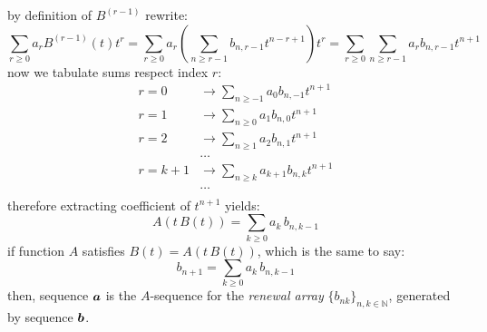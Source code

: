 by definition of $B^{(r-1)}$ rewrite:
\begin{displaymath}
    \sum_{r\geq 0}{a_{r}B^{(r-1)}(t)t^{r}}
        =\sum_{r\geq 0}{a_{r}\left(\sum_{n\geq r-1}{b_{n,r-1}t^{n-r+1}}\right)t^{r}}
        =\sum_{r\geq 0}{\sum_{n\geq r-1}{a_{r}b_{n,r-1}t^{n+1}}}
\end{displaymath}
now we tabulate sums respect index $r$:
\begin{displaymath}
    \begin{split}
        r=0 &\rightarrow \sum_{n\geq -1}{a_{0}b_{n,-1}t^{n+1}}\\
        r=1 &\rightarrow \sum_{n\geq 0}{a_{1}b_{n,0}t^{n+1}}\\
        r=2 &\rightarrow \sum_{n\geq 1}{a_{2}b_{n,1}t^{n+1}}\\
        &\ldots\\
        r=k+1 &\rightarrow \sum_{n\geq k}{a_{k+1}b_{n,k}t^{n+1}}\\
        &\ldots\\
    \end{split}
\end{displaymath}
therefore extracting coefficient of $t^{n+1}$ yields:
\begin{displaymath}
    [t^{n+1}]A(t\,B(t))=\sum_{k\geq 0}{a_{k}\,b_{n,k-1}}
\end{displaymath}
if function $A$ satisfies $B(t)=A(t\,B(t))$, which is the same to say:
\begin{displaymath}
    b_{n+1}=\sum_{k\geq 0}{a_{k}\,b_{n,k-1}}
\end{displaymath}
then, sequence $\boldsymbol{a}$ 
is the $A$-sequence for the \emph{renewal array}
$\lbrace b_{nk}\rbrace_{n,k\in\mathbb{N}}$, generated by
sequence $\boldsymbol{b}$.


